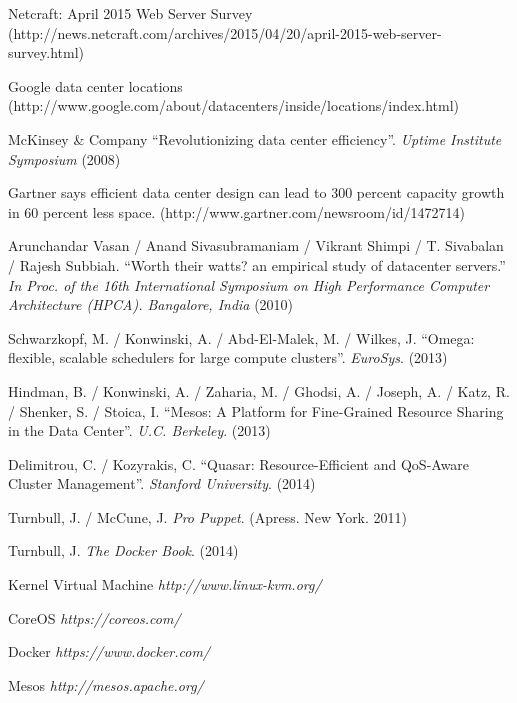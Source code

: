 \documentclass[a4paper,12pt,spanish,final]{epsc_tfc_pfc}
\begin{document}
\begin{thebibliography}{2}


Netcraft: April 2015 Web Server Survey (http://news.netcraft.com/archives/2015/04/20/april-2015-web-server-survey.html)

Google data center locations (http://www.google.com/about/datacenters/inside/locations/index.html)

McKinsey \& Company ``Revolutionizing data center efficiency''. {\it Uptime Institute Symposium}
(2008)

Gartner says efficient data center design can lead to 300 percent capacity growth in 60 percent less space. (http://www.gartner.com/newsroom/id/1472714)

Arunchandar Vasan / Anand Sivasubramaniam / Vikrant Shimpi / T. Sivabalan / Rajesh Subbiah. ``Worth their watts? an empirical study of datacenter servers.'' {\it In Proc. of the 16th International Symposium on High Performance Computer Architecture (HPCA). Bangalore, India} (2010)

Schwarzkopf, M. / Konwinski, A. / Abd-El-Malek, M. / Wilkes, J.
``Omega: flexible, scalable schedulers for large compute clusters''. {\it EuroSys}.
(2013)

Hindman, B. / Konwinski, A. / Zaharia, M. / Ghodsi, A. / Joseph, A. / Katz, R. / Shenker, S. / Stoica, I.
``Mesos: A Platform for Fine-Grained Resource Sharing in the Data Center''. {\it U.C. Berkeley}.
(2013)

Delimitrou, C. / Kozyrakis, C.
``Quasar: Resource-Efficient and QoS-Aware Cluster Management''. {\it Stanford University}.
(2014)

Turnbull, J. / McCune, J.
{\it Pro Puppet}.
(Apress. New York. 2011)

Turnbull, J.
{\it The Docker Book}.
(2014)

Kernel Virtual Machine
{\it http://www.linux-kvm.org/}

CoreOS
{\it https://coreos.com/}

Docker
{\it https://www.docker.com/}

Mesos
{\it http://mesos.apache.org/}

\end{thebibliography}
\end{document}
